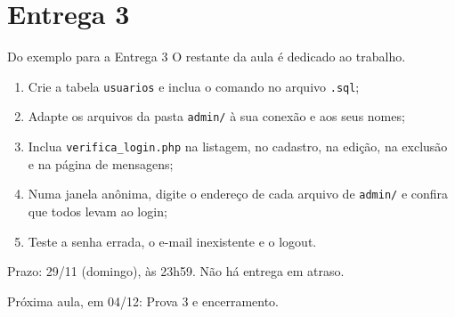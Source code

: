 \documentclass{beamer}
\begin{document}
\section{Entrega 3}

\begin{frame}{Do exemplo para a Entrega 3}
	O restante da aula é dedicado ao trabalho.

	\begin{enumerate}
		\item Crie a tabela \texttt{usuarios} e inclua o comando no arquivo
		      \texttt{.sql};
		\item Adapte os arquivos da pasta \texttt{admin/} à sua conexão e aos seus
		      nomes;
		\item Inclua \texttt{verifica\_login.php} na listagem, no cadastro, na
		      edição, na exclusão e na página de mensagens;
		\item Numa janela anônima, digite o endereço de cada arquivo de
		      \texttt{admin/} e confira que todos levam ao login;
		\item Teste a senha errada, o e-mail inexistente e o logout.
	\end{enumerate}

	\vspace{0.2cm}
	Prazo: 29/11 (domingo), às 23h59. Não há entrega em atraso.

	Próxima aula, em 04/12: Prova 3 e encerramento.
\end{frame}
\end{document}
